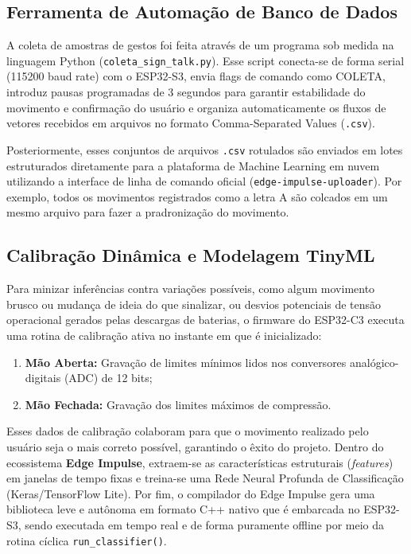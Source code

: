 \documentclass[12pt,a4paper]{article}
\begin{document}
\subsection{Ferramenta de Automação de Banco de Dados}

A coleta de amostras de gestos foi feita através de um programa sob medida na linguagem Python (\texttt{coleta\_sign\_talk.py}). Esse script conecta-se de forma serial (115200 baud rate) com o ESP32-S3, envia flags de comando como COLETA, introduz pausas programadas de 3 segundos para garantir estabilidade do movimento e confirmação do usuário e organiza automaticamente os fluxos de vetores recebidos em arquivos no formato Comma-Separated Values (\texttt{.csv}).

Posteriormente, esses conjuntos de arquivos \texttt{.csv} rotulados são enviados em lotes estruturados diretamente para a plataforma de Machine Learning em nuvem utilizando a interface de linha de comando oficial (\texttt{edge-impulse-uploader}). Por exemplo, todos os movimentos registrados como a letra A são colcados em um mesmo arquivo para fazer a pradronização do movimento.

\subsection{Calibração Dinâmica e Modelagem TinyML}

Para minizar inferências contra variações possíveis, como algum movimento brusco ou mudança de ideia do que sinalizar, ou desvios potenciais de tensão operacional gerados pelas descargas de baterias, o firmware do ESP32-C3 executa uma rotina de calibração ativa no instante em que é inicializado:
\begin{enumerate}
    \item \textbf{Mão Aberta:} Gravação de limites mínimos lidos nos conversores analógico-digitais (ADC) de 12 bits;
    \item \textbf{Mão Fechada:} Gravação dos limites máximos de compressão.
\end{enumerate}

Esses dados de calibração colaboram para que o movimento realizado pelo usuário seja o mais correto possível, garantindo o êxito do projeto. Dentro do ecossistema \textbf{Edge Impulse}, extraem-se as características estruturais (\textit{features}) em janelas de tempo fixas e treina-se uma Rede Neural Profunda de Classificação (Keras/TensorFlow Lite). Por fim, o compilador do Edge Impulse gera uma biblioteca leve e autônoma em formato C++ nativo que é embarcada no ESP32-S3, sendo executada em tempo real e de forma puramente offline por meio da rotina cíclica \texttt{run\_classifier()}.
\end{document}
